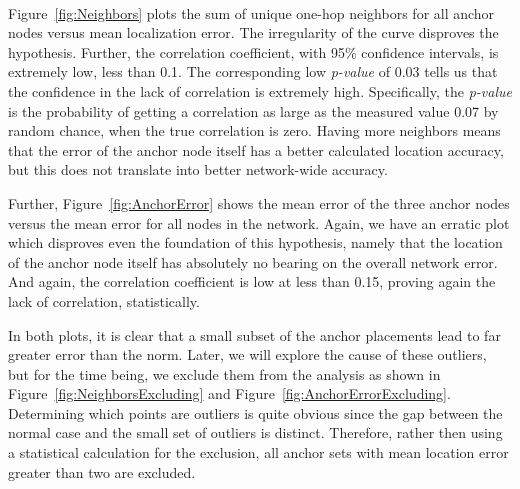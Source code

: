 \begin{figure}
  \centering
	\\
	\caption{}	
	\label{}
\end{figure}

Figure~\ref{fig:Neighbors} plots the sum of unique one-hop neighbors for all anchor nodes versus mean localization error.  The irregularity of the curve disproves the hypothesis. Further, the correlation coefficient, with 95\% confidence intervals, is extremely low, less than 0.1. The corresponding low \emph{p-value} of 0.03 tells us that the confidence in the lack of correlation is extremely high. Specifically, the \emph{p-value} is the probability of getting a correlation as large as the measured value 0.07 by random chance, when the true correlation is zero.  Having more neighbors means that the error of the anchor node itself has a better calculated location accuracy, but this does not translate into better network-wide accuracy.

Further, Figure~\ref{fig:AnchorError} shows the mean error of the three anchor nodes versus the mean error for all nodes in the network. Again, we have an erratic plot which disproves even the foundation of this hypothesis, namely that the location of the anchor node itself has absolutely no bearing on the overall network error. And again, the correlation coefficient is low at less than 0.15, proving again the lack of correlation, statistically.

In both plots, it is clear that a small subset of the anchor placements lead to far greater error than the norm.  Later, we will explore the cause of these outliers, but for the time being, we exclude them from the analysis as shown in Figure~\ref{fig:NeighborsExcluding} and Figure~\ref{fig:AnchorErrorExcluding}. Determining which points are outliers is quite obvious since the gap between the normal case and the small set of outliers is distinct. Therefore, rather then using a statistical calculation for the exclusion, all anchor sets with mean location error greater than two are excluded.  

